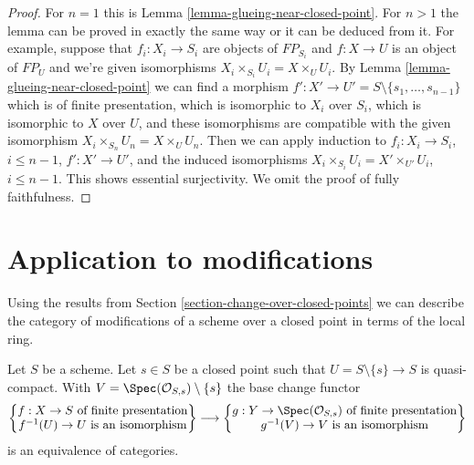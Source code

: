 \begin{proof}
For $n = 1$ this is Lemma \ref{lemma-glueing-near-closed-point}.
For $n > 1$ the lemma can be proved in exactly the same way or it
can be deduced from it. For example, suppose that $f_i : X_i \to S_i$
are objects of $FP_{S_i}$ and $f : X \to U$ is an object
of $FP_U$ and we're given isomorphisms $X_i \times_{S_i} U_i = X \times_U U_i$.
By Lemma \ref{lemma-glueing-near-closed-point} we can find
a morphism $f' : X' \to U' = S \setminus \{s_1, \ldots, s_{n - 1}\}$
which is of finite presentation, which is isomorphic to
$X_i$ over $S_i$, which is isomorphic to $X$ over $U$, and
these isomorphisms are compatible with the given isomorphism
$X_i \times_{S_n} U_n = X \times_U U_n$.
Then we can apply induction to
$f_i : X_i \to S_i$, $i \leq n - 1$,
$f' : X' \to U'$, and the induced
isomorphisms $X_i \times_{S_i} U_i = X' \times_{U'} U_i$, $i \leq n - 1$.
This shows essential surjectivity. We omit the proof of
fully faithfulness.
\end{proof}






\section{Application to modifications}
\label{section-modifications-at-a-point}

\noindent
Using the results from Section \ref{section-change-over-closed-points}
we can describe the category of modifications of
a scheme over a closed point in terms of the local ring.

\begin{lemma}
\label{lemma-modifications}
Let $S$ be a scheme. Let $s \in S$ be a closed point such that
$U = S \setminus \{s\} \to S$ is quasi-compact. With
$V = \Spec(\mathcal{O}_{S, s}) \setminus \{s\}$ the base change functor
$$
\left\{
\begin{matrix}
f : X \to S\text{ of finite presentation} \\
f^{-1}(U) \to U\text{ is an isomorphism}
\end{matrix}
\right\}
\longrightarrow
\left\{
\begin{matrix}
g : Y \to \Spec(\mathcal{O}_{S, s})\text{ of finite presentation} \\
g^{-1}(V) \to V\text{ is an isomorphism}
\end{matrix}
\right\}
$$
is an equivalence of categories.
\end{lemma}

